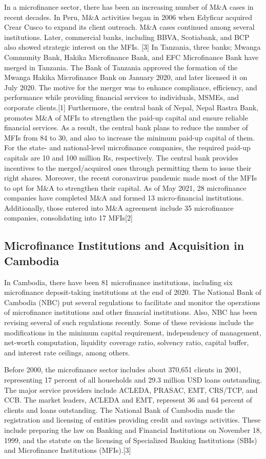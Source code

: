 \documentclass[a4j,12pt]{article}
\begin{document}
In a microfinance sector, there has been an increasing number of M\&A cases in recent decades. In Peru, M\&A activities began in 2006 when Edyficar acquired Crear Cusco to expand its client outreach. M\&A cases continued among several institutions. Later, commercial banks, including BBVA, Scotiabank, and BCP also showed strategic interest on the MFIs. [3]   In Tanzania, three banks; Mwanga Community Bank, Hakika Microfinance Bank, and EFC Microfinance Bank have merged in Tanzania. The Bank of Tanzania approved the formation of the Mwanga Hakika Microfinance Bank on January 2020, and later licensed it on July 2020. The motive for the merger was to enhance compliance, efficiency, and performance while providing financial services to individuals, MSMEs, and corporate clients.[1]
Furthermore, the central bank of Nepal, Nepal Rastra Bank, promotes M\&A of MFIs to strengthen the paid-up capital and ensure reliable financial services. As a result, the central bank plans to reduce the number of MFIs from 84 to 30, and also to increase the minimum paid-up capital of them. For the state- and national-level microfinance companies, the required paid-up capitals are 10 and 100 million Rs, respectively. The central bank provides incentives to the merged/acquired ones through permitting them to issue their right shares. Moreover, the recent coronavirus pandemic made most of the MFIs to opt for M\&A to strengthen their capital. As of May 2021, 28 microfinance companies have completed M\&A and formed 13 micro-financial institutions. Additionally, those entered into M\&A agreement include 35 microfinance companies, consolidating into 17 MFIs[2]


\subsection{Microfinance Institutions and Acquisition in Cambodia}
In Cambodia, there have been 81 microfinance institutions, including six microfinance deposit-taking institutions at the end of 2020. The National Bank of Cambodia (NBC) put several regulations to facilitate and monitor the operations of microfinance institutions and other financial institutions. Also, NBC has been revising several of such regulations recently. Some of these revisions include the modifications in the minimum capital requirement, independency of management, net-worth computation, liquidity coverage ratio, solvency ratio, capital buffer, and interest rate ceilings, among others.   

Before 2000, the microfinance sector includes about 370,651 clients in 2001, representing 17 percent of all households and 29.3 million USD loans outstanding. The major service providers include ACLEDA, PRASAC, EMT, CRS/TCP, and CCB. The market leaders, ACLEDA and EMT, represent 36 and 64 percent of clients and loans outstanding. The National Bank of Cambodia made the registration and licensing of entities providing credit and savings activities. These include preparing the law on Banking and Financial Institutions on November 18, 1999, and the statute on the licensing of Specialized Banking Institutions (SBIs) and Microfinance Institutions (MFIs).[3]  
\end{document}
